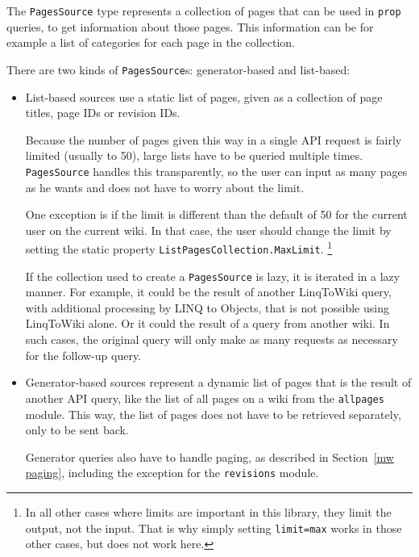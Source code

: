 The \lstinline{PagesSource} type represents a collection of pages that can be used in \texttt{prop} queries,
to get information about those pages.
This information can be for example a list of categories for each page in the collection.

There are two kinds of \lstinline{PagesSource}s: generator-based and list-based:

\begin{itemize}

\item List-based sources use a static list of pages, given as a collection of page titles, page IDs or revision IDs.

Because the number of pages given this way in a single \ac{API} request is fairly limited (usually to 50),
large lists have to be queried multiple times.
\lstinline{PagesSource} handles this transparently, so the user can input as many pages as he wants and does not have to worry about the limit.

One exception is if the limit is different than the default of 50 for the current user on the current wiki.
In that case, the user should change the limit by setting the static property \lstinline{ListPagesCollection.MaxLimit}.%
\footnote{In all other cases where limits are important in this library, they limit the output, not the input.
That is why simply setting \texttt{limit=max} works in those other cases, but does not work here.}

If the collection used to create a \lstinline{PagesSource} is lazy, it is iterated in a lazy manner.
For example, it could be the result of another LinqToWiki query, with additional processing by \ac{LINQ} to Objects,
that is not possible using LinqToWiki alone.
Or it could the result of a query from another wiki.
In such cases, the original query will only make as many requests as necessary for the follow-up query.

\item Generator-based sources represent a dynamic list of pages that is the result of another \ac{API} query,
like the list of all pages on a wiki from the \texttt{allpages} module.
This way, the list of pages does not have to be retrieved separately, only to be sent back.

Generator queries also have to handle paging, as described in Section~\ref{mw paging},
including the exception for the \texttt{revisions} module.

\end{itemize}

